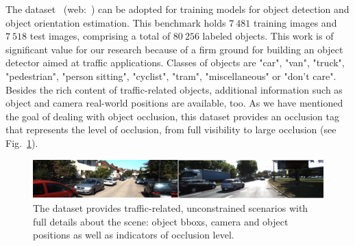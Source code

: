 The  dataset~\cite{geiger2012cvpr} (web:~\cite{webkittiobjdetectiondataset}) can be adopted for training models for object detection and object orientation estimation. This benchmark holds $7\ 481$ training images and $7\ 518$ test images, comprising a total of $80\ 256$ labeled objects. This work is of significant value for our research because of a firm ground for building an object detector aimed at traffic applications. Classes of objects are "car", "van", "truck", "pedestrian", "person sitting", "cyclist", "tram", "miscellaneous" or "don't care". Besides the rich content of traffic-related objects, additional information such as object and camera real-world positions are available, too. As we have mentioned the goal of dealing with object occlusion, this dataset provides an occlusion tag that represents the level of occlusion, from full visibility to large occlusion (see Fig.~\ref{fig:KITTIDetectionDataset}).

\begin{figure}[t]
    \centerline{\includegraphics[width=0.9\linewidth]{figures/datasets/kitti_detection_sample.pdf}}
    \caption[ dataset]{The  dataset provides traffic-related, unconstrained scenarios with full details about the scene: object \glspl{bbox}, camera and object positions as well as indicators of occlusion level. }
    \label{fig:KITTIDetectionDataset}
\end{figure}

